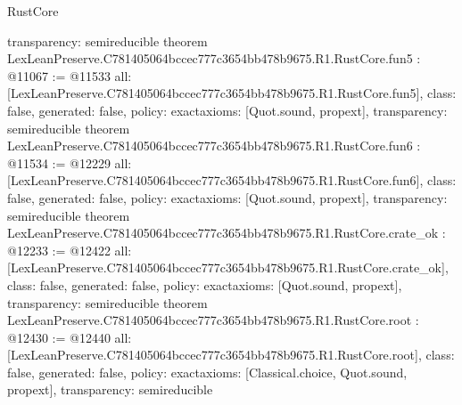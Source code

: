 \begin{lexlean}{RustCore}
\begin{coremodule}
{  transparency: semireducible
}
theorem LexLeanPreserve.C781405064bccec777c3654bb478b9675.R1.RustCore.fun5 : @11067 := @11533 {
  all: [LexLeanPreserve.C781405064bccec777c3654bb478b9675.R1.RustCore.fun5],
  class: false,
  generated: false,
  policy: exact{axioms: [Quot.sound, propext]},
  transparency: semireducible
}
theorem LexLeanPreserve.C781405064bccec777c3654bb478b9675.R1.RustCore.fun6 : @11534 := @12229 {
  all: [LexLeanPreserve.C781405064bccec777c3654bb478b9675.R1.RustCore.fun6],
  class: false,
  generated: false,
  policy: exact{axioms: [Quot.sound, propext]},
  transparency: semireducible
}
theorem LexLeanPreserve.C781405064bccec777c3654bb478b9675.R1.RustCore.crate_ok : @12233 := @12422 {
  all: [LexLeanPreserve.C781405064bccec777c3654bb478b9675.R1.RustCore.crate_ok],
  class: false,
  generated: false,
  policy: exact{axioms: [Quot.sound, propext]},
  transparency: semireducible
}
theorem LexLeanPreserve.C781405064bccec777c3654bb478b9675.R1.RustCore.root : @12430 := @12440 {
  all: [LexLeanPreserve.C781405064bccec777c3654bb478b9675.R1.RustCore.root],
  class: false,
  generated: false,
  policy: exact{axioms: [Classical.choice, Quot.sound, propext]},
  transparency: semireducible
}


\end{coremodule}
\end{lexlean}
